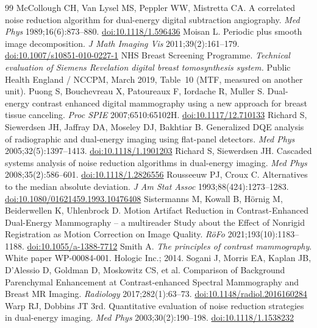 \documentclass[11pt,a4paper]{article}
\begin{document}
\begin{thebibliography}{99}
 McCollough CH, Van Lysel MS, Peppler WW, Mistretta CA. A correlated noise reduction algorithm for dual-energy digital subtraction angiography. \emph{Med Phys} 1989;16(6):873--880. \href{https://doi.org/10.1118/1.596436}{doi:10.1118/1.596436}
 Moisan L. Periodic plus smooth image decomposition. \emph{J Math Imaging Vis} 2011;39(2):161--179. \href{https://doi.org/10.1007/s10851-010-0227-1}{doi:10.1007/s10851-010-0227-1}
 NHS Breast Screening Programme. \emph{Technical evaluation of Siemens Revelation digital breast tomosynthesis system.} Public Health England / NCCPM, March 2019, Table~10 (MTF, measured on another unit).
 Puong S, Bouchevreau X, Patoureaux F, Iordache R, Muller S. Dual-energy contrast enhanced digital mammography using a new approach for breast tissue canceling. \emph{Proc SPIE} 2007;6510:65102H. \href{https://doi.org/10.1117/12.710133}{doi:10.1117/12.710133}
 Richard S, Siewerdsen JH, Jaffray DA, Moseley DJ, Bakhtiar B. Generalized DQE analysis of radiographic and dual-energy imaging using flat-panel detectors. \emph{Med Phys} 2005;32(5):1397--1413. \href{https://doi.org/10.1118/1.1901203}{doi:10.1118/1.1901203}
 Richard S, Siewerdsen JH. Cascaded systems analysis of noise reduction algorithms in dual-energy imaging. \emph{Med Phys} 2008;35(2):586--601. \href{https://doi.org/10.1118/1.2826556}{doi:10.1118/1.2826556}
 Rousseeuw PJ, Croux C. Alternatives to the median absolute deviation. \emph{J Am Stat Assoc} 1993;88(424):1273--1283. \href{https://doi.org/10.1080/01621459.1993.10476408}{doi:10.1080/01621459.1993.10476408}
 Sistermanns M, Kowall B, Hörnig M, Beiderwellen K, Uhlenbrock D. Motion Artifact Reduction in Contrast-Enhanced Dual-Energy Mammography -- a multireader Study about the Effect of Nonrigid Registration as Motion Correction on Image Quality. \emph{R\"oFo} 2021;193(10):1183--1188. \href{https://doi.org/10.1055/a-1388-7712}{doi:10.1055/a-1388-7712}
 Smith A. \emph{The principles of contrast mammography}. White paper WP-00084-001. Hologic Inc.; 2014.
 Sogani J, Morris EA, Kaplan JB, D'Alessio D, Goldman D, Moskowitz CS, et al. Comparison of Background Parenchymal Enhancement at Contrast-enhanced Spectral Mammography and Breast MR Imaging. \emph{Radiology} 2017;282(1):63--73. \href{https://doi.org/10.1148/radiol.2016160284}{doi:10.1148/radiol.2016160284}
 Warp RJ, Dobbins JT 3rd. Quantitative evaluation of noise reduction strategies in dual-energy imaging. \emph{Med Phys} 2003;30(2):190--198. \href{https://doi.org/10.1118/1.1538232}{doi:10.1118/1.1538232}

\end{thebibliography}
\end{document}
